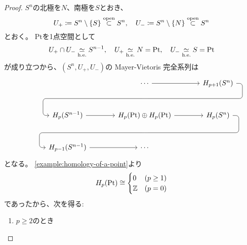 \documentclass[report]{jlreq}
\begin{document}
\begin{proof}
    $S^n$の北極を$N$、南極を$S$とおき、
    \begin{equation}
        U_+ \coloneqq S^n \setminus \{ S \} \stackrel{\text{open}}{\subset} S^n,
        \quad
        U_- \coloneqq S^n \setminus \{ N \} \stackrel{\text{open}}{\subset} S^n
    \end{equation}
    とおく。
    $\mathrm{Pt}$を1点空間として
    \begin{equation}
        U_+ \cap U_- \simeqhe S^{n - 1},
        \quad
        U_+ \simeqhe N = \mathrm{Pt},
        \quad
        U_- \simeqhe S = \mathrm{Pt}
    \end{equation}
    が成り立つから、$(S^n, U_+, U_-)$の Mayer-Vietoris 完全系列は
    \begin{equation}
        \begin{tikzcd}[column sep=large, row sep=large]
            && \cdots \ar{r} \ar[phantom]{d}[name=X1, anchor=center]{}
                & H_{p+1}(S^n) \ar[rounded corners,
                        to path={
                            -- ([xshift=2ex]\tikztostart.east)
                            |- (X1.center) \tikztonodes
                            -| ([xshift=-2ex]\tikztotarget.west)
                            -- (\tikztotarget)
                        }]{dll} \\
            & H_p(S^{n - 1}) \ar{r}
                & H_p(\mathrm{Pt}) \oplus H_p(\mathrm{Pt})
                    \ar{r} \ar[phantom]{d}[name=X2, anchor=center]{}
                & H_p(S^n) \ar[rounded corners,
                        to path={
                            -- ([xshift=2ex]\tikztostart.east)
                            |- (X2.center) \tikztonodes
                            -| ([xshift=-2ex]\tikztotarget.west)
                            -- (\tikztotarget)
                        }]{dll} \\
            & H_{p-1}(S^{n - 1}) \ar{r}
                & \cdots
        \end{tikzcd}
    \end{equation}
    となる。
    \cref{example:homology-of-a-point}より
    \begin{equation}
        H_p(\mathrm{Pt}) \cong \begin{cases}
            0 & (p \ge 1) \\
            \mathbb{Z} & (p = 0)
        \end{cases}
    \end{equation}
    であったから、次を得る:
    \begin{enumerate}
        \item $p \ge 2$のとき

\end{enumerate}
\end{proof}
\end{document}

